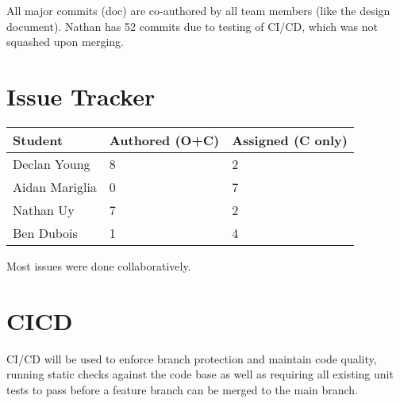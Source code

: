 \documentclass{article}
\begin{document}
All major commits (doc) are co-authored by all team members (like the design document). Nathan has 52 commits due to testing of CI/CD, which was not squashed upon merging. 

\section{Issue Tracker}

\begin{table}[H]
\centering
\begin{tabular}{lll}
\toprule
\textbf{Student} & \textbf{Authored (O+C)} & \textbf{Assigned (C only)}\\
\midrule
Declan Young & 8 & 2 \\
Aidan Mariglia & 0 & 7 \\
Nathan Uy & 7 & 2 \\
Ben Dubois & 1 & 4 \\
\bottomrule
\end{tabular}
\end{table}

Most issues were done collaboratively.

\section{CICD}

CI/CD will be used to enforce branch protection and maintain code quality, running static checks against the code base as well as requiring all existing unit tests to pass before a feature branch can be merged to the main branch.
\end{document}
